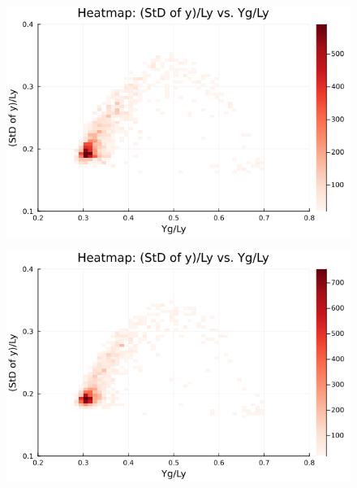 \begin{figure}[H]
  \centering
  \includegraphics[scale=0.6]{image/RaRtmap10_heat/2023-12-28T12:38:51.752_map_10times_chi1.265_Ay50_rho0.4_T0.43_dT0.04_Rd0.0_Rt0.125_Ra1.4081535_g0.0003999718779659611_run4.0e8.png}
  \label{}
\end{figure}

\begin{figure}[H]
  \centering
  \includegraphics[scale=0.6]{image/RaRtmap10_heat/2023-12-28T12:38:51.827_map_10times_chi1.265_Ay50_rho0.4_T0.43_dT0.04_Rd0.0_Rt0.125_Ra1.877538_g0.0003999718779659611_run4.0e8.png}
  \label{}
\end{figure}

